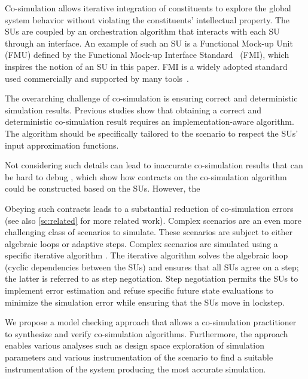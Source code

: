 Co-simulation allows iterative integration of constituents to explore the global system behavior without violating the constituents' intellectual property. 
The SUs are coupled by an orchestration algorithm that interacts with each SU through an interface.
An example of such an SU is a Functional Mock-up Unit (FMU) defined by the Functional Mock-up Interface Standard~\cite{FMI2014} (FMI), which inspires the notion of an SU in this paper. FMI is a widely adopted standard used commercially and supported by many tools~\cite{Tools_FMI}.

The overarching challenge of co-simulation is ensuring correct and deterministic simulation results. 
Previous studies \cite{Gomes2019,Oakes2021,Gomes2018f,Schweizer2015c} show that obtaining a correct and deterministic co-simulation result requires an implementation-aware algorithm.
The algorithm should be specifically tailored to the scenario to respect the SUs' input approximation functions.

Not considering such details can lead to inaccurate co-simulation results that can be hard to debug \cite{Gomes2019,Oakes2021}, which show how contracts on the co-simulation algorithm could be constructed based on the SUs. 
However, the 

Obeying such contracts leads to a substantial reduction of co-simulation errors (see also \cref{sc:related} for more related work). 
Complex scenarios are an even more challenging class of scenarios to simulate.
These scenarios are subject to either algebraic loops or adaptive steps. 
Complex scenarios are simulated using a specific iterative algorithm \cite{thrane2021}. 
The iterative algorithm solves the algebraic loop (cyclic dependencies between the SUs) and ensures that all SUs agree on a step; the latter is referred to as step negotiation. 
Step negotiation permits the SUs to implement error estimation and refuse specific future state evaluations to minimize the simulation error while ensuring that the SUs move in lockstep.


We propose a model checking approach that allows a co-simulation practitioner to synthesize and verify co-simulation algorithms.
Furthermore, the approach enables various analyses such as design space exploration of simulation parameters and various instrumentation of the scenario to find a suitable instrumentation of the system producing the most accurate simulation.


